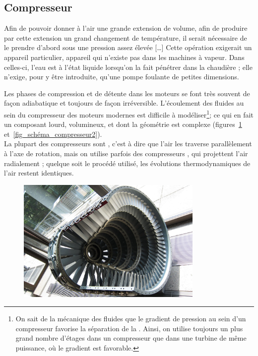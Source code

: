 	\subsection{Compresseur}
	
			Afin de pouvoir donner à l’air une grande extension de volume, afin de produire par cette extension un grand changement de température, il serait nécessaire de le prendre d’abord sous une pression assez élevée […] Cette opération exigerait un appareil particulier, appareil qui n’existe pas dans les machines à vapeur. Dans celles-ci, l’eau est à l’état liquide lorsqu’on la fait pénétrer dans la chaudière ; elle n’exige, pour y être introduite, qu’une pompe foulante de petites dimensions.
	
		Les phases de compression et de détente dans les moteurs se font très souvent de façon adiabatique et toujours de façon irréversible. L’écoulement des fluides au sein du compresseur des moteurs modernes est difficile à modéliser\footnote{On sait de la mécanique des fluides que le gradient de pression au sein d’un compresseur favorise la séparation de la . Ainsi, on utilise toujours un plus grand nombre d’étages dans un compresseur que dans une turbine de même puissance, où le gradient est favorable.}\nolinebreak ; ce qui en fait un composant lourd, volumineux, et dont la géométrie est complexe (figures~\ref{fig_schéma_compresseur1} et~\ref{fig_schéma_compresseur2}).\\
		La plupart des compresseurs sont , c’est à dire que l’air les traverse parallèlement à l’axe de rotation, mais on utilise parfois des compresseurs , qui projettent l’air radialement ; quelque soit le procédé utilisé, les évolutions thermodynamiques de l’air restent identiques.

		\begin{figure}
			\begin{center}
				\includegraphics[width=9cm]{images/photo_compresseur.jpg}
			\end{center}
			\label{fig_schéma_compresseur1}
		\end{figure}

